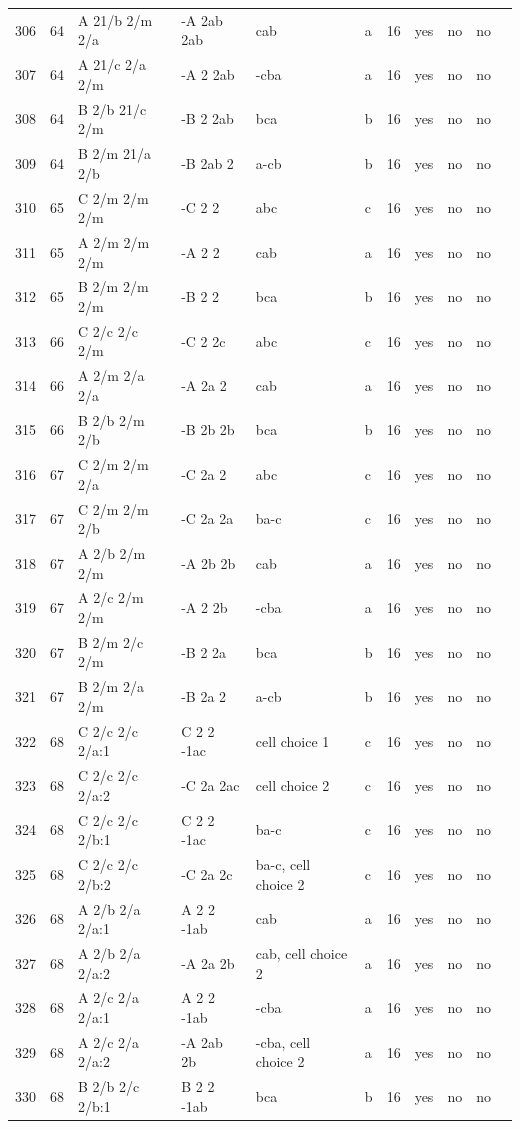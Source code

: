 \begin{center}
\begin{small}
\begin{longtable}{|l|l|l|l|l|l|l|l|l|l|l|}
306 &64 &A 21/b 2/m 2/a &-A 2ab 2ab &cab &a &16 &yes &no &no \\ 
307 &64 &A 21/c 2/a 2/m &-A 2 2ab &-cba &a &16 &yes &no &no \\ 
308 &64 &B 2/b 21/c 2/m &-B 2 2ab &bca &b &16 &yes &no &no \\ 
309 &64 &B 2/m 21/a 2/b &-B 2ab 2 &a-cb &b &16 &yes &no &no \\ 
310 &65 &C 2/m 2/m 2/m &-C 2 2 &abc &c &16 &yes &no &no \\ 
311 &65 &A 2/m 2/m 2/m &-A 2 2 &cab &a &16 &yes &no &no \\ 
312 &65 &B 2/m 2/m 2/m &-B 2 2 &bca &b &16 &yes &no &no \\ 
313 &66 &C 2/c 2/c 2/m &-C 2 2c &abc &c &16 &yes &no &no \\ 
314 &66 &A 2/m 2/a 2/a &-A 2a 2 &cab &a &16 &yes &no &no \\ 
315 &66 &B 2/b 2/m 2/b &-B 2b 2b &bca &b &16 &yes &no &no \\ 
316 &67 &C 2/m 2/m 2/a &-C 2a 2 &abc &c &16 &yes &no &no \\ 
317 &67 &C 2/m 2/m 2/b &-C 2a 2a &ba-c &c &16 &yes &no &no \\ 
318 &67 &A 2/b 2/m 2/m &-A 2b 2b &cab &a &16 &yes &no &no \\ 
319 &67 &A 2/c 2/m 2/m &-A 2 2b &-cba &a &16 &yes &no &no \\ 
320 &67 &B 2/m 2/c 2/m &-B 2 2a &bca &b &16 &yes &no &no \\ 
321 &67 &B 2/m 2/a 2/m &-B 2a 2 &a-cb &b &16 &yes &no &no \\ 
322 &68 &C 2/c 2/c 2/a:1 &C 2 2 -1ac &cell choice 1 &c &16 &yes &no &no \\ 
323 &68 &C 2/c 2/c 2/a:2 &-C 2a 2ac &cell choice 2 &c &16 &yes &no &no \\ 
324 &68 &C 2/c 2/c 2/b:1 &C 2 2 -1ac &ba-c &c &16 &yes &no &no \\ 
325 &68 &C 2/c 2/c 2/b:2 &-C 2a 2c &ba-c, cell choice 2 &c &16 &yes &no &no \\ 
326 &68 &A 2/b 2/a 2/a:1 &A 2 2 -1ab &cab &a &16 &yes &no &no \\ 
327 &68 &A 2/b 2/a 2/a:2 &-A 2a 2b &cab, cell choice 2 &a &16 &yes &no &no \\ 
328 &68 &A 2/c 2/a 2/a:1 &A 2 2 -1ab &-cba &a &16 &yes &no &no \\ 
329 &68 &A 2/c 2/a 2/a:2 &-A 2ab 2b &-cba, cell choice 2 &a &16 &yes &no &no \\ 
330 &68 &B 2/b 2/c 2/b:1 &B 2 2 -1ab &bca &b &16 &yes &no &no \\ 

\end{longtable}
\end{small}
\end{center}
